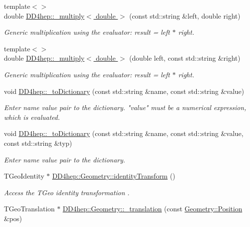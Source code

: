 \begin{DoxyCompactItemize}
{\footnotesize template$<$$>$ }\\double \hyperlink{group___d_d4_h_e_p___g_e_o_m_e_t_r_y_ga71cbe44a7c57c0fc3111353f928a0f8d}{D\+D4hep\+::\+\_\+multiply$<$ double $>$} (const std\+::string \&left, double right)
\begin{DoxyCompactList}\small\item\em Generic multiplication using the evaluator\+: result = left $\ast$ right. \end{DoxyCompactList}\item 
{\footnotesize template$<$$>$ }\\double \hyperlink{group___d_d4_h_e_p___g_e_o_m_e_t_r_y_ga03961a16ebae2dd8a6750b65c5486ea2}{D\+D4hep\+::\+\_\+multiply$<$ double $>$} (double left, const std\+::string \&right)
\begin{DoxyCompactList}\small\item\em Generic multiplication using the evaluator\+: result = left $\ast$ right. \end{DoxyCompactList}\item 
void \hyperlink{group___d_d4_h_e_p___g_e_o_m_e_t_r_y_gaaf303de968d2679957961df3928767c1}{D\+D4hep\+::\+\_\+to\+Dictionary} (const std\+::string \&name, const std\+::string \&value)
\begin{DoxyCompactList}\small\item\em Enter name value pair to the dictionary. "value" must be a numerical expression, which is evaluated. \end{DoxyCompactList}\item 
void \hyperlink{group___d_d4_h_e_p___g_e_o_m_e_t_r_y_gae255c713c9960e1779d1f16bb16b1d63}{D\+D4hep\+::\+\_\+to\+Dictionary} (const std\+::string \&name, const std\+::string \&value, const std\+::string \&typ)
\begin{DoxyCompactList}\small\item\em Enter name value pair to the dictionary. \end{DoxyCompactList}\item 
T\+Geo\+Identity $\ast$ \hyperlink{group___d_d4_h_e_p___g_e_o_m_e_t_r_y_gacb7266110e19d4dda6cc6b2ebc57bd39}{D\+D4hep\+::\+Geometry\+::identity\+Transform} ()
\begin{DoxyCompactList}\small\item\em Access the T\+Geo identity transformation . \end{DoxyCompactList}\item 
T\+Geo\+Translation $\ast$ \hyperlink{group___d_d4_h_e_p___g_e_o_m_e_t_r_y_ga2a9c214ef0a2444cccf194669fe81771}{D\+D4hep\+::\+Geometry\+::\+\_\+translation} (const \hyperlink{namespace_d_d4hep_1_1_geometry_a55083902099d03506c6db01b80404900}{Geometry\+::\+Position} \&pos)

\end{DoxyCompactItemize}
